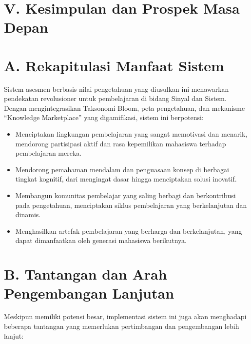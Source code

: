 \documentclass[
  letterpaper,
  DIV=11,
  numbers=noendperiod]{scrreprt}
\begin{document}
\section{V. Kesimpulan dan Prospek Masa
Depan}\label{v.-kesimpulan-dan-prospek-masa-depan}

\section{A. Rekapitulasi Manfaat
Sistem}\label{a.-rekapitulasi-manfaat-sistem}

Sistem asesmen berbasis nilai pengetahuan yang diusulkan ini menawarkan
pendekatan revolusioner untuk pembelajaran di bidang Sinyal dan Sistem.
Dengan mengintegrasikan Taksonomi Bloom, peta pengetahuan, dan mekanisme
``Knowledge Marketplace'' yang digamifikasi, sistem ini berpotensi:

\begin{itemize}
\item
  Menciptakan lingkungan pembelajaran yang sangat memotivasi dan
  menarik, mendorong partisipasi aktif dan rasa kepemilikan mahasiswa
  terhadap pembelajaran mereka.
\item
  Mendorong pemahaman mendalam dan penguasaan konsep di berbagai tingkat
  kognitif, dari mengingat dasar hingga menciptakan solusi inovatif.
\item
  Membangun komunitas pembelajar yang saling berbagi dan berkontribusi
  pada pengetahuan, menciptakan siklus pembelajaran yang berkelanjutan
  dan dinamis.
\item
  Menghasilkan artefak pembelajaran yang berharga dan berkelanjutan,
  yang dapat dimanfaatkan oleh generasi mahasiswa berikutnya.
\end{itemize}

\section{B. Tantangan dan Arah Pengembangan
Lanjutan}\label{b.-tantangan-dan-arah-pengembangan-lanjutan}

Meskipun memiliki potensi besar, implementasi sistem ini juga akan
menghadapi beberapa tantangan yang memerlukan pertimbangan dan
pengembangan lebih lanjut:
\end{document}
